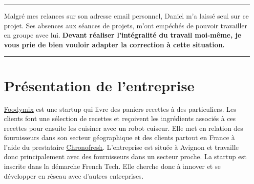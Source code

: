 \documentclass{article}
\begin{document}
\restoregeometry %
\nopagecolor%
\pagestyle{fancy}
\fancyhf{}
\rhead{\today}
{
\hypersetup{linkcolor=black}
\tableofcontents
}

{\color{ups}
\vspace{24pt}
\hrule
\vspace{12pt}
Malgré mes relances sur son adresse email personnel, Daniel m'a laissé seul sur ce projet. Ses absences aux séances de projets, m'ont empéchés de pouvoir travailler en groupe avec lui. \textbf{Devant réaliser l'intégralité du travail moi-même, je vous prie de bien vouloir adapter la correction à cette situation.}
\vspace{12pt}
\hrule
\vspace{12pt}}

\newpage

\part{Présentation de l'entreprise}
\setcounter{section}{0}
\href{https://foodymix.fr/}{Foodymix} est une startup qui livre des paniers recettes à des particuliers. Les clients font une sélection de recettes et reçoivent les ingrédients associés à ces recettes pour ensuite les cuisiner avec un robot cuiseur. Elle met en relation des fournisseurs dans son secteur géographique et des clients partout en France à l'aide du prestataire \href{https://www.chronofresh.fr/fr}{Chronofresh}. L'entreprise est située à Avignon et travaille donc principalement avec des fournisseurs dans un secteur proche.
La startup est inscrite dans la démarche French Tech. Elle cherche donc à innover et se développer en réseau avec d'autres entreprises.
\end{document}

